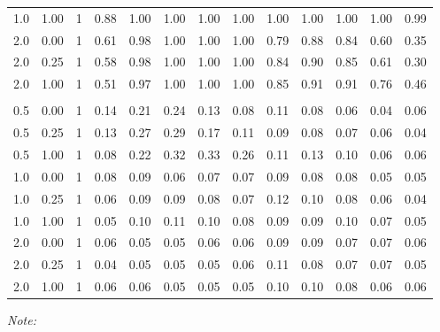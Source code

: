 \begin{table}
\begin{threeparttable}
\begin{tabular}[t]{rrrrrrrrrrrrr}
\hspace{1em}1.0 & 1.00 & 1 & 0.88 & 1.00 & 1.00 & 1.00 & 1.00 & 1.00 & 1.00 & 1.00 & 1.00 & 0.99\\
\hspace{1em}2.0 & 0.00 & 1 & 0.61 & 0.98 & 1.00 & 1.00 & 1.00 & 0.79 & 0.88 & 0.84 & 0.60 & 0.35\\
\hspace{1em}2.0 & 0.25 & 1 & 0.58 & 0.98 & 1.00 & 1.00 & 1.00 & 0.84 & 0.90 & 0.85 & 0.61 & 0.30\\
\hspace{1em}2.0 & 1.00 & 1 & 0.51 & 0.97 & 1.00 & 1.00 & 1.00 & 0.85 & 0.91 & 0.91 & 0.76 & 0.46\\
\addlinespace[0.3em]
\multicolumn{13}{c}{\textbf{2 Discrete Practices - Type I}}\\
\hspace{1em}0.5 & 0.00 & 1 & 0.14 & 0.21 & 0.24 & 0.13 & 0.08 & 0.11 & 0.08 & 0.06 & 0.04 & 0.06\\
\hspace{1em}0.5 & 0.25 & 1 & 0.13 & 0.27 & 0.29 & 0.17 & 0.11 & 0.09 & 0.08 & 0.07 & 0.06 & 0.04\\
\hspace{1em}0.5 & 1.00 & 1 & 0.08 & 0.22 & 0.32 & 0.33 & 0.26 & 0.11 & 0.13 & 0.10 & 0.06 & 0.06\\
\hspace{1em}1.0 & 0.00 & 1 & 0.08 & 0.09 & 0.06 & 0.07 & 0.07 & 0.09 & 0.08 & 0.08 & 0.05 & 0.05\\
\hspace{1em}1.0 & 0.25 & 1 & 0.06 & 0.09 & 0.09 & 0.08 & 0.07 & 0.12 & 0.10 & 0.08 & 0.06 & 0.04\\
\hspace{1em}1.0 & 1.00 & 1 & 0.05 & 0.10 & 0.11 & 0.10 & 0.08 & 0.09 & 0.09 & 0.10 & 0.07 & 0.05\\
\hspace{1em}2.0 & 0.00 & 1 & 0.06 & 0.05 & 0.05 & 0.06 & 0.06 & 0.09 & 0.09 & 0.07 & 0.07 & 0.06\\
\hspace{1em}2.0 & 0.25 & 1 & 0.04 & 0.05 & 0.05 & 0.05 & 0.06 & 0.11 & 0.08 & 0.07 & 0.07 & 0.05\\
\hspace{1em}2.0 & 1.00 & 1 & 0.06 & 0.06 & 0.05 & 0.05 & 0.05 & 0.10 & 0.10 & 0.08 & 0.06 & 0.06\\
\bottomrule
\end{tabular}
\begin{tablenotes}
\item \textit{Note: } 

\end{tablenotes}
\end{threeparttable}
\end{table}

